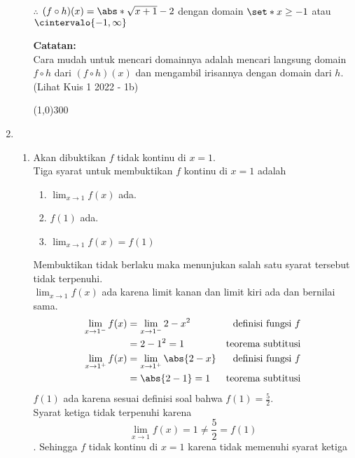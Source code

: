 \begin{enumerate}[leftmargin=*, label={\arabic*}.]
\begin{enumerate}[label={\alph*}.]
$\therefore$ $(f \circ h)(x) = \abs*{\sqrt{x+1} - 2}$ dengan domain 
$\set*{x \geq -1}$ atau $\cintervalo{-1,\infty}$ 
    
\vspace{0.1cm}
\textbf{Catatan:}\\
Cara mudah untuk mencari domainnya adalah mencari langsung domain 
$f \circ h$ dari $(f \circ h)(x)$ dan mengambil irisannya dengan 
domain dari $h$. (Lihat Kuis 1 2022 - 1b)
\begin{center}
    \line(1,0){300}
\end{center}
\end{enumerate}
\item
\begin{enumerate}[label={\alph*}.]
\item Akan dibuktikan $f$ tidak kontinu di $x=1$.\\
Tiga syarat untuk membuktikan $f$ kontinu di $x=1$ adalah
\begin{enumerate}[label={\arabic*}.]
    \item $\lim_{x\to 1} f(x)$ ada.
    \item $f(1)$ ada.
    \item $\lim_{x\to 1} f(x) = f(1)$
\end{enumerate}
Membuktikan tidak berlaku maka menunjukan salah satu syarat tersebut tidak
terpenuhi.\\
$\lim_{x\to 1} f(x)$ ada karena limit kanan dan limit kiri ada dan bernilai sama.
\begin{align*}
    \lim_{x\to 1^{-}} f(x) 
    &= \lim_{x\to 1^{-}} 2-x^{2}
    &\text{definisi fungsi $f$}\\
    &= 2-1^{2} = 1
    &\text{teorema subtitusi}\\
    \lim_{x\to 1^{+}} f(x) 
    &= \lim_{x\to 1^{+}} \abs{2-x}
    &\text{definisi fungsi $f$}\\
    &= \abs{2-1} = 1
    &\text{teorema subtitusi}
\end{align*}
$f(1)$ ada karena sesuai definisi soal bahwa $f(1) = \frac{5}{2}$.\\
Syarat ketiga tidak terpenuhi karena
\[
    \lim_{x\to 1} f(x) = 1 \neq \frac{5}{2} = f(1)
\].
Sehingga $f$ tidak kontinu di $x=1$ karena tidak memenuhi syarat ketiga


\end{enumerate}
\end{enumerate}
